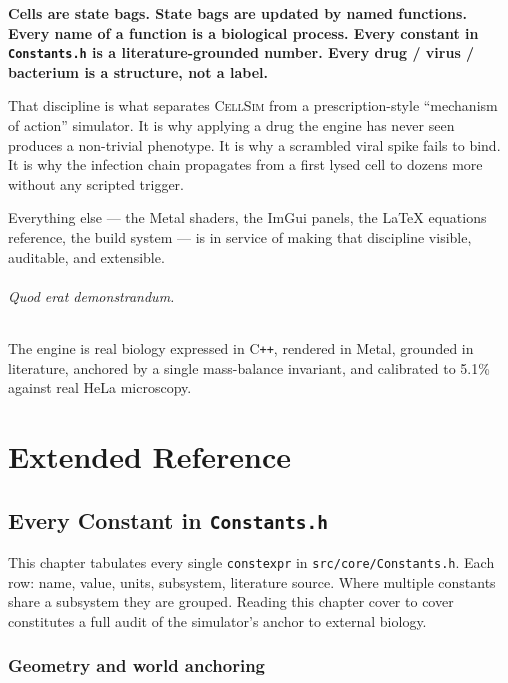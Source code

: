 \documentclass[11pt,letterpaper,twoside,openany]{book}
\newcommand{\code}[1]{\texttt{#1}}
\newcommand{\file}[1]{\texttt{\small#1}}
\begin{document}
\textbf{Cells are state bags. State bags are updated by named
functions. Every name of a function is a biological process.
Every constant in \file{Constants.h} is a literature-grounded
number. Every drug / virus / bacterium is a structure, not a
label.}

That discipline is what separates \textsc{CellSim} from a
prescription-style ``mechanism of action'' simulator. It is why
applying a drug the engine has never seen produces a non-trivial
phenotype. It is why a scrambled viral spike fails to bind. It is
why the infection chain propagates from a first lysed cell to
dozens more without any scripted trigger.

Everything else --- the Metal shaders, the ImGui panels, the
LaTeX equations reference, the build system --- is in service of
making that discipline visible, auditable, and extensible.

\paragraph{Quod erat demonstrandum.} The engine is real biology
expressed in C\texttt{++}, rendered in Metal, grounded in
literature, anchored by a single mass-balance invariant, and
calibrated to 5.1\% against real HeLa microscopy.

\part{Extended Reference}

\chapter{Every Constant in \texttt{Constants.h}}
\label{ch:every-constant}

This chapter tabulates every single \code{constexpr} in
\file{src/core/Constants.h}. Each row: name, value, units,
subsystem, literature source. Where multiple constants share a
subsystem they are grouped. Reading this chapter cover to cover
constitutes a full audit of the simulator's anchor to external
biology.

\section{Geometry and world anchoring}
\end{document}
